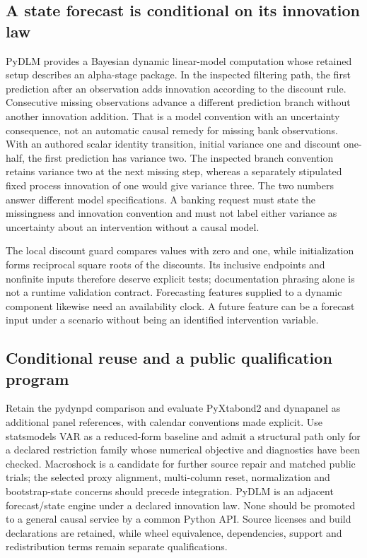 \subsection{A state forecast is conditional on its innovation law}

PyDLM provides a Bayesian dynamic linear-model computation whose retained setup describes an alpha-stage package. In the inspected filtering path, the first prediction after an observation adds innovation according to the discount rule. Consecutive missing observations advance a different prediction branch without another innovation addition. That is a model convention with an uncertainty consequence, not an automatic causal remedy for missing bank observations. With an authored scalar identity transition, initial variance one and discount one-half, the first prediction has variance two. The inspected branch convention retains variance two at the next missing step, whereas a separately stipulated fixed process innovation of one would give variance three. The two numbers answer different model specifications. A banking request must state the missingness and innovation convention and must not label either variance as uncertainty about an intervention without a causal model.~\citep{exec25_pydyn_pydlm,exec25_pydyn_choice}

The local discount guard compares values with zero and one, while initialization forms reciprocal square roots of the discounts. Its inclusive endpoints and nonfinite inputs therefore deserve explicit tests; documentation phrasing alone is not a runtime validation contract. Forecasting features supplied to a dynamic component likewise need an availability clock. A future feature can be a forecast input under a scenario without being an identified intervention variable.~\citep{exec25_pydyn_pydlm}

\subsection{Conditional reuse and a public qualification program}

Retain the pydynpd comparison and evaluate PyXtabond2 and dynapanel as additional panel references, with calendar conventions made explicit. Use statsmodels VAR as a reduced-form baseline and admit a structural path only for a declared restriction family whose numerical objective and diagnostics have been checked. Macroshock is a candidate for further source repair and matched public trials; the selected proxy alignment, multi-column reset, normalization and bootstrap-state concerns should precede integration. PyDLM is an adjacent forecast/state engine under a declared innovation law. None should be promoted to a general causal service by a common Python API. Source licenses and build declarations are retained, while wheel equivalence, dependencies, support and redistribution terms remain separate qualifications.~\citep{exec25_pydyn_choice}

